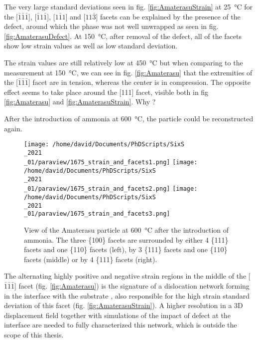 The very large standard deviations seen in fig. \ref{fig:AmaterasuStrain} at \qty{25}{\degreeCelsius} for the [$\bar{1}\bar{1}\bar{1}$], [$\bar{1}1\bar{1}$], [$1\bar{1}1$] and [$11\bar{3}$] facets can be explained by the presence of the defect, around which the phase was not well unwrapped as seen in fig. \ref{fig:AmaterasuDefect}.
At \qty{150}{\degreeCelsius}, after removal of the defect, all of the facets show low strain values as well as low standard deviation.

The strain values are still relatively low at \qty{450}{\degreeCelsius} but when comparing to the measurement at \qty{150}{\degreeCelsius}, we can see in fig. \ref{fig:Amaterasu} that the extremities of the [$\bar{1}\bar{1}\bar{1}$] facet are in tension, whereas the center is in compression.
The opposite effect seems to take place around the [111] facet, visible both in fig \ref{fig:Amaterasu} and \ref{fig:AmaterasuStrain}.
\textcolor{Important}{Why ?}

After the introduction of ammonia at \qty{600}{\degreeCelsius}, the particle could be reconstructed again.

\begin{figure}[!htb]
    \centering
    \texttt{[image: /home/david/Documents/PhDScripts/SixS\\\_2021\\\_01/paraview/1675\_strain\_and\_facets1.png]}
    \texttt{[image: /home/david/Documents/PhDScripts/SixS\\\_2021\\\_01/paraview/1675\_strain\_and\_facets2.png]}
    \texttt{[image: /home/david/Documents/PhDScripts/SixS\\\_2021\\\_01/paraview/1675\_strain\_and\_facets3.png]}
    \caption{
        View of the Amaterasu particle at \qty{600}{\degreeCelsius} after the introduction of ammonia.
        The three \{100\} facets are surrounded by either 4 \{111\} facets and one \{110\} facets (left), by 3 \{111\} facets and one \{110\} facets (middle) or by 4 \{111\} facets (right).
    }
    \label{fig:AmaterasuStrain1675}
\end{figure}

The alternating highly positive and negative strain regions in the middle of the [$\bar{1}\bar{1}\bar{1}$] facet (fig. \ref{fig:Amaterasu}) is the signature of a dislocation network forming in the interface with the substrate \parencite{Dupraz2015}, also responsible for the high strain standard deviation of this facet (fig. \ref{fig:AmaterasuStrain}).
A higher resolution in a 3D displacement field together with simulations of the impact of defect at the interface are needed to fully characterized this network, which is outside the scope of this thesis.


